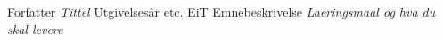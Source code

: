 \begin{thebibliography}{99}	%
		Forfatter
		\emph{Tittel}
		Utgivelsesår etc.
		EiT Emnebeskrivelse
		\emph{Laeringsmaal og hva du skal levere}

\end{thebibliography}